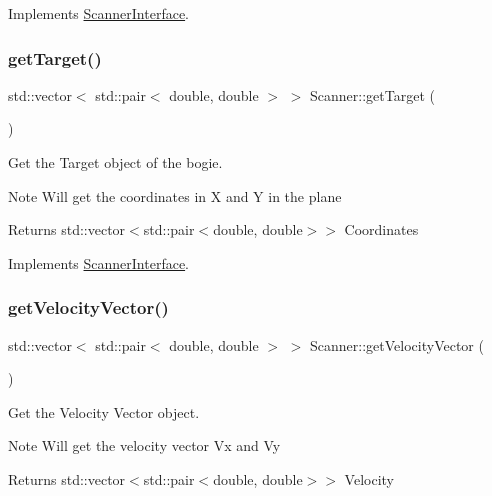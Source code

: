 Implements \hyperlink{classScannerInterface_a27f991c8667a4c2524580addd264ae70}{Scanner\+Interface}.

\mbox{\label{classScanner_a556ac0598666bf9543099daef4655d6b}} 
\subsubsection{\texorpdfstring{get\+Target()}{getTarget()}}
{\footnotesize\ttfamily std\+::vector$<$ std\+::pair$<$ double, double $>$ $>$ Scanner\+::get\+Target (\begin{DoxyParamCaption}{ }\end{DoxyParamCaption})\hspace{0.3cm}{\ttfamily [virtual]}}



Get the Target object of the bogie. 

\begin{DoxyNote}{Note}
Will get the coordinates in X and Y in the plane 
\end{DoxyNote}
\begin{DoxyReturn}{Returns}
std\+::vector$<$std\+::pair$<$double, double$>$$>$ Coordinates 
\end{DoxyReturn}


Implements \hyperlink{classScannerInterface_a526bd963b27ac01be5844bfcb9ecdb27}{Scanner\+Interface}.

\mbox{\label{classScanner_aa551cad3b1137f4fbe052181f09f987f}} 
\subsubsection{\texorpdfstring{get\+Velocity\+Vector()}{getVelocityVector()}}
{\footnotesize\ttfamily std\+::vector$<$ std\+::pair$<$ double, double $>$ $>$ Scanner\+::get\+Velocity\+Vector (\begin{DoxyParamCaption}{ }\end{DoxyParamCaption})\hspace{0.3cm}{\ttfamily [virtual]}}



Get the Velocity Vector object. 

\begin{DoxyNote}{Note}
Will get the velocity vector Vx and Vy 
\end{DoxyNote}
\begin{DoxyReturn}{Returns}
std\+::vector$<$std\+::pair$<$double, double$>$$>$ Velocity 
\end{DoxyReturn}


